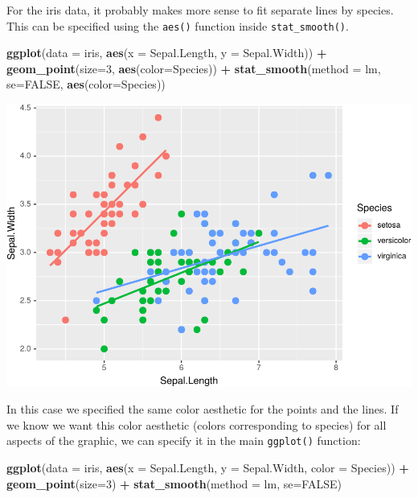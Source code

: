 \documentclass[]{krantz}
\makeatletter
\newenvironment{Shaded}{\begin{snugshade}}{\end{snugshade}}
\newcommand{\DataTypeTok}[1]{\textcolor[rgb]{0.27,0.27,0.27}{#1}}
\newcommand{\DecValTok}[1]{\textcolor[rgb]{0.06,0.06,0.06}{#1}}
\newcommand{\KeywordTok}[1]{\textcolor[rgb]{0.27,0.27,0.27}{\textbf{#1}}}
\newcommand{\NormalTok}[1]{#1}
\newcommand{\OperatorTok}[1]{\textcolor[rgb]{0.43,0.43,0.43}{\textbf{#1}}}
\newcommand{\OtherTok}[1]{\textcolor[rgb]{0.37,0.37,0.37}{#1}}
\newcommand{\StringTok}[1]{\textcolor[rgb]{0.5,0.5,0.5}{#1}}
\newenvironment{kframe}{%
\medskip{}
\setlength{\fboxsep}{.8em}
 \def\at@end@of@kframe{}%
 \ifinner\ifhmode%
  \def\at@end@of@kframe{\end{minipage}}%
  \begin{minipage}{\columnwidth}%
 \fi\fi%
 \def\FrameCommand##1{\hskip\@totalleftmargin \hskip-\fboxsep
 \colorbox{shadecolor}{##1}\hskip-\fboxsep
     \hskip-\linewidth \hskip-\@totalleftmargin \hskip\columnwidth}%
 \MakeFramed {\advance\hsize-\width
   \@totalleftmargin\z@ \linewidth\hsize
   \@setminipage}}%
 {\par\unskip\endMakeFramed%
 \at@end@of@kframe}
\renewenvironment{Shaded}{\begin{kframe}}{\end{kframe}}
\makeatother
\begin{document}
For the iris data, it probably makes more sense to fit separate lines by species. This can be specified using the \texttt{aes()} function inside \texttt{stat\_smooth()}.

\begin{Shaded}
\begin{Highlighting}[]
\KeywordTok{ggplot}\NormalTok{(}\DataTypeTok{data =}\NormalTok{ iris, }\KeywordTok{aes}\NormalTok{(}\DataTypeTok{x =}\NormalTok{ Sepal.Length, }\DataTypeTok{y =}\NormalTok{ Sepal.Width)) }\OperatorTok{+}\StringTok{ }
\StringTok{    }\KeywordTok{geom_point}\NormalTok{(}\DataTypeTok{size=}\DecValTok{3}\NormalTok{, }\KeywordTok{aes}\NormalTok{(}\DataTypeTok{color=}\NormalTok{Species)) }\OperatorTok{+}\StringTok{ }
\StringTok{    }\KeywordTok{stat_smooth}\NormalTok{(}\DataTypeTok{method =}\NormalTok{ lm, }\DataTypeTok{se=}\OtherTok{FALSE}\NormalTok{, }\KeywordTok{aes}\NormalTok{(}\DataTypeTok{color=}\NormalTok{Species))}
\end{Highlighting}
\end{Shaded}

\includegraphics{bookdown_files/figure-latex/unnamed-chunk-63-1.pdf}

In this case we specified the same color aesthetic for the points and the lines. If we know we want this color aesthetic (colors corresponding to species) for all aspects of the graphic, we can specify it in the main \texttt{ggplot()} function:

\begin{Shaded}
\begin{Highlighting}[]
\KeywordTok{ggplot}\NormalTok{(}\DataTypeTok{data =}\NormalTok{ iris, }\KeywordTok{aes}\NormalTok{(}\DataTypeTok{x =}\NormalTok{ Sepal.Length, }\DataTypeTok{y =}\NormalTok{ Sepal.Width, }\DataTypeTok{color =}\NormalTok{ Species)) }\OperatorTok{+}\StringTok{ }
\StringTok{    }\KeywordTok{geom_point}\NormalTok{(}\DataTypeTok{size=}\DecValTok{3}\NormalTok{) }\OperatorTok{+}\StringTok{ }\KeywordTok{stat_smooth}\NormalTok{(}\DataTypeTok{method =}\NormalTok{ lm, }\DataTypeTok{se=}\OtherTok{FALSE}\NormalTok{)}
\end{Highlighting}
\end{Shaded}
\end{document}
